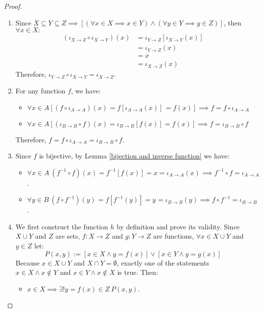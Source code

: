 \documentclass[a4paper]{book}
\newtheorem*{proof}{\textit{Proof.}}
\theoremstyle{break}
\begin{document}
			\begin{proof}~
				\begin{enumerate}[label=($\alph*$)]
					\item Since $X\subseteq Y\subseteq Z\implies[(\forall x\in X\implies x\in Y)\land(\forall y\in Y\implies y\in Z)]$, then $\forall x\in X:$
						\begin{align*}
							(\iota_{X\to Z}\circ\iota_{X\to Y})(x)&=\iota_{Y\to Z}[\iota_{X\to Y}(x)]\\
							&=\iota_{Y\to Z}(x)\\
							&=x\\
							&=\iota_{X\to Z}(x)
						\end{align*}
						Therefore, $\iota_{Y\to Z}\circ\iota_{X\to Y}=\iota_{X\to Z}$.
					\item For any function $f$, we have:
						\begin{itemize}
							\item $\forall x\in A[(f\circ\iota_{A\to A})(x)\mspace{1mu}=f[\iota_{A\to A}(x)]\mspace{2mu}=f(x)]\implies f=f\circ\iota_{A\to A}$
							\item $\forall x\in A[(\iota_{B\to B}\circ f)(x)=\iota_{B\to B}[f(x)]=f(x)]\implies f=\iota_{B\to B}\circ f$
						\end{itemize}
						Therefore, $f=f\circ\iota_{A\to A}=\iota_{B\to B}\circ f$.
					\item Since $f$ is bijective, by Lemma \ref{bijection and inverse function} we have:
					\begin{itemize}
						\item $\forall x\in A~(f^{-1}\circ f)(x)=f^{-1}[f(x)]=x=\iota_{A\to A}(x)\mspace{1mu}\implies f^{-1}\circ f=\iota_{A\to A}$.
						\item $\forall y\in B~(f\circ f^{-1})(y)\mspace{1mu}=f[f^{-1}(y)]=y\mspace{1mu}=\iota_{B\to B}(y)\implies f\circ f^{-1}=\iota_{B\to B}$.
					\end{itemize}
					\item We first construct the function $h$ by definition and prove its validity. Since $X\cup Y$ and $Z$ are sets, $f:X\to Z$ and $g:Y\to Z$ are functions, $\forall x\in X\cup Y$ and $y\in Z$ let:
					$$P(x,y):=[x\in X\land y=f(x)]\lor[x\in Y\land y=g(x)]$$
					Because $x\in X\cup Y$ and $X\cap Y=\emptyset$, exactly one of the statements $x\in X\land x\notin Y$ and $x\in Y\land x\notin X$ is true. Then:
					\begin{itemize}
						\item $x\in X\implies\exists!y=f(x)\in Z~P(x,y)$.

\end{itemize}
\end{enumerate}
\end{proof}
\end{document}
